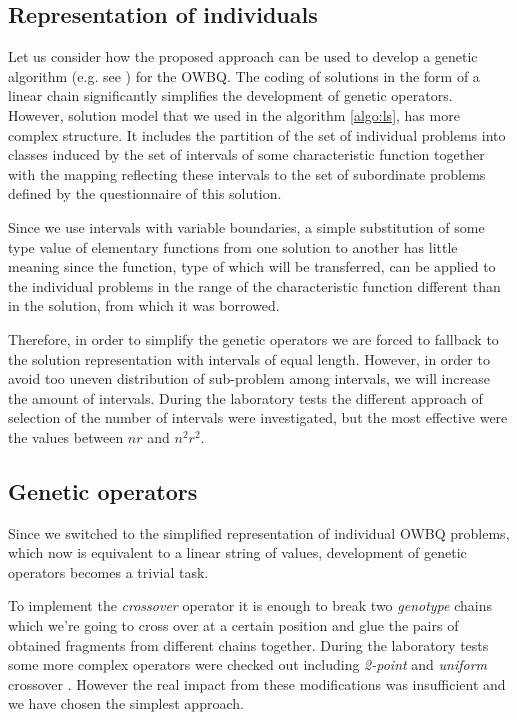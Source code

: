 \documentclass[11pt]{article}
\begin{document}
%
%
%
\subsection{Representation of individuals}
Let us consider how the proposed approach can be used to develop a genetic algorithm (e.g. see \cite{Ho, Be1, Be2}) for the OWBQ. The coding of solutions in the form of a linear chain significantly simplifies the development of genetic operators. However, solution model that we used in the algorithm \ref{algo:ls}, has more complex structure. It includes the partition of the set of individual problems into classes induced by the set of intervals of some characteristic function together with the mapping reflecting these intervals to the set of subordinate problems defined by the questionnaire of this solution. 

Since we use intervals with variable boundaries, a simple substitution of some type value of elementary functions from one solution to another has little meaning since the function, type of which will be transferred, can be applied to the individual problems in the range of the characteristic function different than in the solution, from which it was borrowed.

Therefore, in order to simplify the genetic operators we are forced to fallback to the solution representation with intervals of equal length. However, in order to avoid too uneven distribution of sub-problem among intervals, we will increase the amount of intervals. During the laboratory tests the different approach of selection of the number of intervals were investigated, but the most effective were the values between $nr$ and $n^2r^2$.

%
%
%
\subsection{Genetic operators}
Since we switched to the simplified representation of individual OWBQ problems, which now is equivalent to a linear string of values, development of genetic operators becomes a trivial task.

To implement the \emph{crossover} operator it is enough to break two \emph{genotype} chains which we're going to cross over at a certain position and glue the pairs of obtained fragments from different chains together. During the laboratory tests some more complex operators were checked out including \emph{2-point} and \emph{uniform} crossover \cite{Be1}. However the real impact from these modifications was insufficient and we have chosen the simplest approach.
\end{document}
